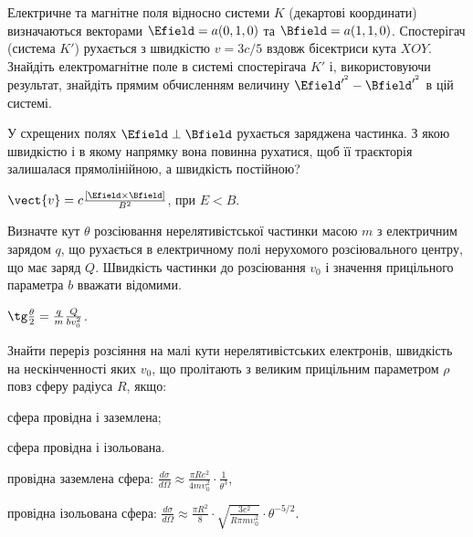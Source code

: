 \begin{problem}
Електричне та магнітне поля відносно системи $K$ (декартові координати) визначаються векторами $\Efield = a(0,1,0)$ та $\Bfield = a(1,1,0)$. Спостерігач (система $K'$) рухається з швидкістю $v=3c/5$ вздовж бісектриси кута $XOY$. Знайдіть електромагнітне поле в системі спостерігача $K'$ і, використовуючи результат, знайдіть прямим обчисленням величину $\Efield^{\prime^2} - \Bfield^{\prime^2}$  в цій системі.
\end{problem}

\begin{problem}%
У схрещених полях $\Efield\perp\Bfield$ рухається заряджена частинка. З якою швидкістю і в якому напрямку вона повинна рухатися, щоб її траєкторія залишалася прямолінійною, а швидкість постійною?
\begin{solution}
	$\vect{v} = c \frac{\left[ \Efield\times\Bfield\right] }{B^2}$, при $E<B$.
\end{solution}
\end{problem}

\begin{problem}
Визначте кут $\theta$ розсіювання нерелятивістської частинки масою $m$ з електричним зарядом $q$, що рухається в електричному полі нерухомого розсіювального центру, що має заряд $Q$. Швидкість частинки до розсіювання $v_0$ і значення прицільного параметра $b$ вважати відомими.
\begin{solution}
	$\tg\frac{\theta}{2} = \frac qm \frac{Q}{bv_0^2}$.
\end{solution}
\end{problem}

\begin{problem}
Знайти переріз розсіяння на малі кути нерелятивістських електронів, швидкість на нескінченності яких $v_0$, що пролітають з великим прицільним параметром $\rho$ повз сферу радіуса $R$, якщо:
\begin{enumerate*}[label=\alph*)]
	\item сфера провідна і заземлена;
	\item сфера провідна і ізольована.
\end{enumerate*}

\begin{solution}
	\begin{enumerate*}[label=\alph*)]
		\item провідна заземлена сфера: $\frac{d\sigma}{d\Omega} \approx \frac{\pi Re^2}{4mυ_0^2} \cdot \frac{1}{\theta ^3}$,
		\item провідна ізольована сфера: $\frac{d\sigma}{d\Omega} \approx \frac{\pi R^2}{8} \cdot \sqrt {\frac{3e^2}{R\pi mυ_0^2}}\cdot\theta^{-5/2}$.
	\end{enumerate*}
\end{solution}
\end{problem}

